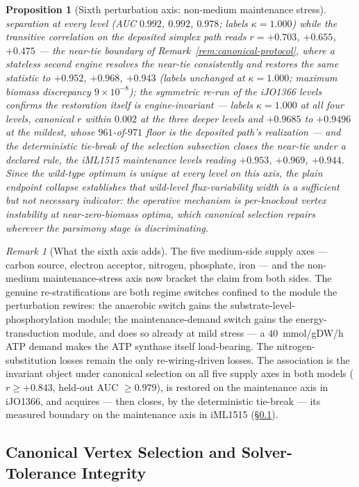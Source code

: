 \documentclass[11pt,a4paper]{article}
\theoremstyle{plain}
\newtheorem{proposition}[theorem]{Proposition}
\theoremstyle{definition}
\theoremstyle{remark}
\newtheorem{remark}[theorem]{Remark}
\begin{document}
\begin{proposition}[Sixth perturbation axis: non-medium
maintenance stress]
separation at every level (AUC $0.992$, $0.992$, $0.978$; labels
$\kappa=1.000$) while the transitive correlation on the deposited
simplex path reads $r=+0.703$, $+0.655$, $+0.475$ --- the near-tie
boundary of Remark~\ref{rem:canonical-protocol}, where a stateless
second engine resolves the near-tie consistently and restores the
same statistic to $+0.952$, $+0.968$, $+0.943$ (labels unchanged at
$\kappa=1.000$; maximum biomass discrepancy $9\times10^{-8}$); the
symmetric re-run of the iJO1366 levels confirms the restoration
itself is engine-invariant --- labels $\kappa=1.000$ at all four
levels, canonical $r$ within $0.002$ at the three deeper levels and
$+0.9685$ to $+0.9496$ at the mildest, whose $961$-of-$971$ floor is
the deposited path's realization --- and the deterministic tie-break
of the selection subsection closes the near-tie under a declared
rule, the iML1515 maintenance levels reading $+0.953$, $+0.969$,
$+0.944$. Since the wild-type optimum is
unique at every level on this axis, the plain endpoint collapse
establishes that wild-level flux-variability width is a sufficient
but not necessary indicator: the operative mechanism is per-knockout
vertex instability at near-zero-biomass optima, which canonical
selection repairs wherever the parsimony stage is discriminating.
\end{proposition}

\begin{remark}[What the sixth axis adds]
\label{rem:keio-multiaxis}
The five medium-side supply axes --- carbon source, electron
acceptor, nitrogen, phosphate, iron --- and the non-medium
maintenance-stress axis now bracket the claim from both sides. The
genuine re-stratifications are both regime switches confined to
the module the perturbation rewires: the anaerobic switch gains
the substrate-level-phosphorylation module; the maintenance-demand
switch gains the energy-transduction module, and does so already
at mild stress --- a $40$~mmol/gDW/h ATP demand makes the ATP
synthase itself load-bearing. The nitrogen-substitution losses
remain the only re-wiring-driven losses. The association is the
invariant object under canonical selection on all five supply
axes in both models ($r\ge+0.843$, held-out AUC $\ge0.979$),
is restored on the maintenance axis in iJO1366, and acquires --- then closes, by the
deterministic tie-break --- its measured boundary on the maintenance
axis in iML1515 (\S\ref{sec:canonical-selection}).
\end{remark}

\subsection{Canonical Vertex Selection and Solver-Tolerance Integrity}
\label{sec:canonical-selection}
\end{document}
